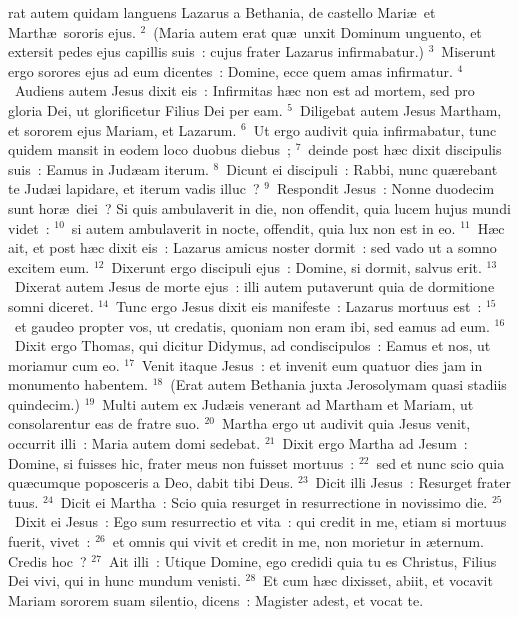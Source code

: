 \bchapter
{}rat autem quidam languens Lazarus a Bethania, de castello Mari\ae\ et Marth\ae\ sororis ejus.
${}^{2}$~(Maria autem erat qu\ae\ unxit Dominum unguento, et extersit pedes ejus capillis suis~: cujus frater Lazarus infirmabatur.)
${}^{3}$~Miserunt ergo sorores ejus ad eum dicentes~: Domine, ecce quem amas infirmatur.
${}^{4}$~Audiens autem Jesus dixit eis~: Infirmitas h\ae c non est ad mortem, sed pro gloria Dei, ut glorificetur Filius Dei per eam.
${}^{5}$~Diligebat autem Jesus Martham, et sororem ejus Mariam, et Lazarum.
${}^{6}$~Ut ergo audivit quia infirmabatur, tunc quidem mansit in eodem loco duobus diebus~;
${}^{7}$~deinde post h\ae c dixit discipulis suis~: Eamus in Jud\ae am iterum.
${}^{8}$~Dicunt ei discipuli~: Rabbi, nunc qu\ae rebant te Jud\ae i lapidare, et iterum vadis illuc~?
${}^{9}$~Respondit Jesus~: Nonne duodecim sunt hor\ae\ diei~? Si quis ambulaverit in die, non offendit, quia lucem hujus mundi videt~:
${}^{10}$~si autem ambulaverit in nocte, offendit, quia lux non est in eo.
${}^{11}$~H\ae c ait, et post h\ae c dixit eis~: Lazarus amicus noster dormit~: sed vado ut a somno excitem eum.
${}^{12}$~Dixerunt ergo discipuli ejus~: Domine, si dormit, salvus erit.
${}^{13}$~Dixerat autem Jesus de morte ejus~: illi autem putaverunt quia de dormitione somni diceret.
${}^{14}$~Tunc ergo Jesus dixit eis manifeste~: Lazarus mortuus est~:
${}^{15}$~et gaudeo propter vos, ut credatis, quoniam non eram ibi, sed eamus ad eum.
${}^{16}$~Dixit ergo Thomas, qui dicitur Didymus, ad condiscipulos~: Eamus et nos, ut moriamur cum eo.
${}^{17}$~Venit itaque Jesus~: et invenit eum quatuor dies jam in monumento habentem.
${}^{18}$~(Erat autem Bethania juxta Jerosolymam quasi stadiis quindecim.)
${}^{19}$~Multi autem ex Jud\ae is venerant ad Martham et Mariam, ut consolarentur eas de fratre suo.
${}^{20}$~Martha ergo ut audivit quia Jesus venit, occurrit illi~: Maria autem domi sedebat.
${}^{21}$~Dixit ergo Martha ad Jesum~: Domine, si fuisses hic, frater meus non fuisset mortuus~:
${}^{22}$~sed et nunc scio quia qu\ae cumque poposceris a Deo, dabit tibi Deus.
${}^{23}$~Dicit illi Jesus~: Resurget frater tuus.
${}^{24}$~Dicit ei Martha~: Scio quia resurget in resurrectione in novissimo die.
${}^{25}$~Dixit ei Jesus~: Ego sum resurrectio et vita~: qui credit in me, etiam si mortuus fuerit, vivet~:
${}^{26}$~et omnis qui vivit et credit in me, non morietur in \ae ternum. Credis hoc~?
${}^{27}$~Ait illi~: Utique Domine, ego credidi quia tu es Christus, Filius Dei vivi, qui in hunc mundum venisti.
${}^{28}$~Et cum h\ae c dixisset, abiit, et vocavit Mariam sororem suam silentio, dicens~: Magister adest, et vocat te.
